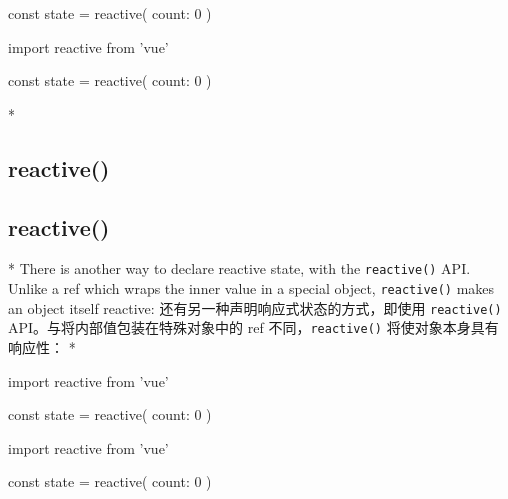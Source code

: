 \begin{paracol}{2}
\begin{codeJs}
const state = reactive({ count: 0 })
\end{codeJs}  
\switchcolumn
\begin{codeJs}
import { reactive } from 'vue'

const state = reactive({ count: 0 })
\end{codeJs}

\switchcolumn[0]*%
\subsection{reactive()}
\switchcolumn
\subsection{reactive()}
\switchcolumn[0]*%
There is another way to declare reactive state, with the
\texttt{reactive()} API. Unlike a ref which wraps the inner value in a
special object, \texttt{reactive()} makes an object itself reactive:
\switchcolumn
还有另一种声明响应式状态的方式，即使用 \texttt{reactive()}
API。与将内部值包装在特殊对象中的 ref 不同，\texttt{reactive()}
将使对象本身具有响应性：
\switchcolumn[0]*%
\begin{codeJs}
import { reactive } from 'vue'

const state = reactive({ count: 0 })
\end{codeJs}
\switchcolumn
\begin{codeJs}
import { reactive } from 'vue'

const state = reactive({ count: 0 })
\end{codeJs}


\end{paracol}
